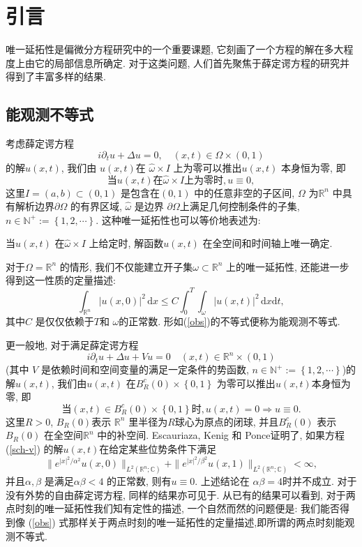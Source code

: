 \documentclass[master]{cugthesis}
\newcommand\N{\ensuremath{\mathbb{N}}}
\newcommand\R{\ensuremath{\mathbb{R}}}
\renewcommand\d{\ensuremath{\,\mathrm{d}}}
\renewcommand\C{\ensuremath{\mathbb{C}}}
\begin{document}
    \makefrontpages 
    \chapter{引言}
    
    唯一延拓性是偏微分方程研究中的一个重要课题, 它刻画了一个方程的解在多大程度上由它的局部信息所确定. 对于这类问题, 人们首先聚焦于薛定谔方程的研究并得到了丰富多样的结果.
    \section{能观测不等式}
    考虑薛定谔方程
    \begin{equation}
      i\partial_t u+\Delta u=0, \quad (x,t) \in  \Omega \times (0,1)\label{sch}
    \end{equation}
    的解$u(x,t)$, 我们由 $u(x,t)$在 $\hat{\omega}\times I$ 上为零可以推出$u(x,t)$ 本身恒为零\cite{Lebeau1992}, 即
    \[
      \text{当}u(x,t)\text{在} \hat{\omega}\times I\text{上为零时},  u\equiv 0, 
    \] 
    这里$I=(a,b)\subset (0,1)$ 是包含在$(0,1)$ 中的任意非空的子区间, $\Omega$ 为$\R^{n}$ 中具有解析边界$\partial \Omega$ 的有界区域, $\hat{\omega}$ 是边界 $\partial\Omega$上满足几何控制条件的子集, $n\in \N^{+}:=\left\{1,2,\cdots \right\} $. 这种唯一延拓性也可以等价地表述为:
    \begin{center}
      当$u(x,t)$ 在$\hat{\omega}\times I$ 上给定时, 解函数$u(x,t)$ 在全空间和时间轴上唯一确定.
    \end{center} 
    对于$\Omega=\R^{n}$ 的情形, 我们不仅能建立开子集$\omega\subset \R^{n}$ 上的唯一延拓性, 还能进一步得到这一性质的定量描述:
    \begin{equation}
      \int_{\R^{n}}|u(x,0)|^2\d x\le C \int_0^{T}\int_{\omega}|u(x,t)|^2\d x \mathrm{d}t,\label{obs}
    \end{equation}
    其中$C$ 是仅仅依赖于$T$和 $\omega$的正常数. 形如(\ref{obs})的不等式便称为能观测不等式.


    更一般地, 对于满足薛定谔方程
    \begin{equation}
      i\partial_t u+\Delta u +Vu=0 \quad (x,t)\in  \R^{n}\times (0,1)\label{sch-v}
    \end{equation}
    (其中 $V$ 是依赖时间和空间变量的满足一定条件的势函数, $n\in  \N^{+}:=\left\{1,2,\cdots \right\} $)的解$u(x,t)$, 我们由$u(x,t)$ 在$B^{c}_R(0)\times \left\{0,1\right\}$ 为零可以推出$u(x,t)$本身恒为零\cite{IONESCU200690}, 即
    \[
      \text{当}(x,t) \in B^{c}_R(0)\times \left\{0,1\right\} \text{时},u(x,t)=0 \Rightarrow u\equiv 0.
    \] 
    这里$R>0$,  $B_R(0)$表示 $\R^{n}$ 里半径为$R$球心为原点的闭球, 并且$B_R^{c}(0)$ 表示$B_R(0)$ 在全空间$\R^{n}$ 中的补空间. Escauriaza, Kenig 和 Ponce证明了\cite{Esca2010}, 如果方程 (\ref{sch-v}) 的解$u(x,t)$在给定某些位势条件下满足
    \[
      \|e^{|x|^2 /\alpha^2}u(x,0)\|_{L^2(\R^{n};\C)}+\|e^{|x|^2 /\beta^2}u(x,1)\|_{L^2\left( \R^{n};\C \right) }<\infty,
    \] 
    并且$\alpha,\beta $ 是满足$\alpha \beta<4$ 的正常数, 则有$u\equiv 0$. 上述结论在 $\alpha \beta=4$时并不成立. 对于没有外势的自由薛定谔方程, 同样的结果亦可见于\cite{Esca2010}. 从已有的结果可以看到, 对于两点时刻的唯一延拓性我们知有定性的描述, 一个自然而然的问题便是: 我们能否得到像 (\ref{obs}) 式那样关于两点时刻的唯一延拓性的定量描述,即所谓的两点时刻能观测不等式.
\end{document}
